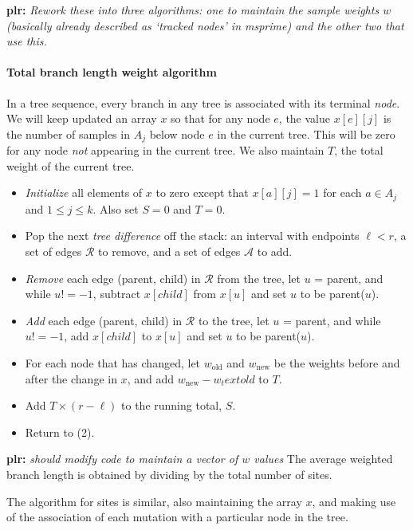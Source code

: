 \documentclass{article}
\newcommand{\iw}{w} %
\newcommand{\plr}[1]{{\color{blue}\textbf{plr:} \it #1}}
\begin{document}
\plr{Rework these into three algorithms: one to maintain the sample weights $\iw$
    (basically already described as `tracked nodes' in msprime)
    and the other two that use this.}

\paragraph{Total branch length weight algorithm}
In a tree sequence, every branch in any tree is associated with its terminal \emph{node}.
We will keep updated an array $x$ so that for any node $e$,
the value $x[e][j]$ is the number of samples in $A_j$ below node $e$ in the current tree.
This will be zero for any node \emph{not} appearing in the current tree.
We also maintain $T$, the total weight of the current tree.
\begin{itemize}
    \item \emph{Initialize} all elements of $x$ to zero
        except that $x[a][j] = 1$ for each $a \in A_j$ and $1 \le j \le k$.
        Also set $S=0$ and $T=0$.
    \item Pop the next \emph{tree difference} off the stack: an interval with endpoints $\ell < r$,
        a set of edges $\mathcal{R}$ to remove, and a set of edges $\mathcal{A}$ to add.
    \item \emph{Remove} each edge (parent, child) in $\mathcal{R}$ from the tree,
        let $u$ = parent, and while $u != -1$,
        subtract $x[child]$ from $x[u]$ and set $u$ to be parent($u$).
    \item \emph{Add} each edge (parent, child) in $\mathcal{R}$ to the tree,
        let $u$ = parent, and while $u != -1$,
        add $x[child]$ to $x[u]$ and set $u$ to be parent($u$).
    \item For each node that has changed, let $w_\text{old}$ and $w_\text{new}$
        be the weights before and after the change in $x$,
        and add $w_\text{new} - w_text{old}$ to $T$.
    \item Add $T \times (r-\ell)$ to the running total, $S$.
    \item Return to (2).
\end{itemize}
\plr{should modify code to maintain a vector of $w$ values}
The average weighted branch length is obtained by dividing by the total number of sites.

The algorithm for sites is similar, also maintaining the array $x$,
and making use of the association of each mutation with a particular node in the tree.
\end{document}
